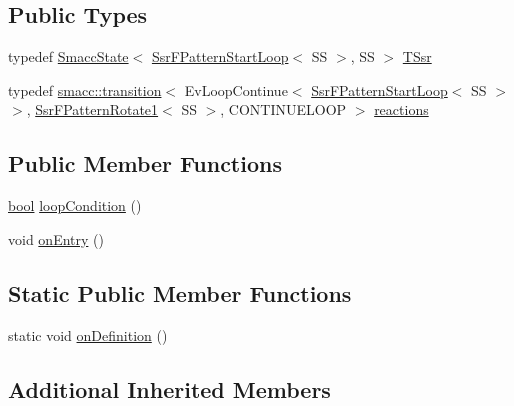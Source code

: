 \subsection*{Public Types}
\begin{DoxyCompactItemize}
\item 
typedef \hyperlink{classSmaccState}{Smacc\+State}$<$ \hyperlink{structsm__dance__bot_1_1fpattern__substates_1_1SsrFPatternStartLoop}{Ssr\+F\+Pattern\+Start\+Loop}$<$ SS $>$, SS $>$ \hyperlink{structsm__dance__bot_1_1fpattern__substates_1_1SsrFPatternStartLoop_aa063c6366a9400768535ec2a288a27ea}{T\+Ssr}
\item 
typedef \hyperlink{classsmacc_1_1transition}{smacc\+::transition}$<$ Ev\+Loop\+Continue$<$ \hyperlink{structsm__dance__bot_1_1fpattern__substates_1_1SsrFPatternStartLoop}{Ssr\+F\+Pattern\+Start\+Loop}$<$ SS $>$ $>$, \hyperlink{structsm__dance__bot_1_1fpattern__substates_1_1SsrFPatternRotate1}{Ssr\+F\+Pattern\+Rotate1}$<$ SS $>$, C\+O\+N\+T\+I\+N\+U\+E\+L\+O\+OP $>$ \hyperlink{structsm__dance__bot_1_1fpattern__substates_1_1SsrFPatternStartLoop_af922bdea061c7c6b08d1082ae9ae9ec0}{reactions}
\end{DoxyCompactItemize}
\subsection*{Public Member Functions}
\begin{DoxyCompactItemize}
\item 
\hyperlink{classbool}{bool} \hyperlink{structsm__dance__bot_1_1fpattern__substates_1_1SsrFPatternStartLoop_abf9e3981b32695ec1739f9a5d11015cd}{loop\+Condition} ()
\item 
void \hyperlink{structsm__dance__bot_1_1fpattern__substates_1_1SsrFPatternStartLoop_a434225b4591b2ec9db73e299d58a79a3}{on\+Entry} ()
\end{DoxyCompactItemize}
\subsection*{Static Public Member Functions}
\begin{DoxyCompactItemize}
\item 
static void \hyperlink{structsm__dance__bot_1_1fpattern__substates_1_1SsrFPatternStartLoop_a76f90d3ea5ec89f03a4659bc8fa44fc9}{on\+Definition} ()
\end{DoxyCompactItemize}
\subsection*{Additional Inherited Members}


